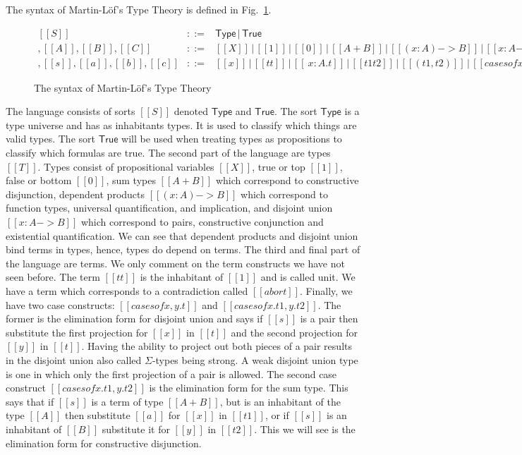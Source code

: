 The syntax of Martin-L\"of's Type Theory is defined in
Fig.~\ref{fig:lof_syntax}.
\begin{figure}
  \begin{center}
    \begin{math}
      \begin{array}{lll}
        [[S]] & ::= & \mathsf{Type}\,|\,\mathsf{True}\\
        [[T]], [[A]], [[B]], [[C]]        & ::= & [[X]]\,|\,[[1]]\,|\,[[0]]\,|\,[[A + B]]\,|\,[[( x : A ) -> B]]\,|\,[[{ x : A } -> B]]\\
        [[t]], [[s]], [[a]], [[b]], [[c]] & ::= & [[x]]\,|\,[[tt]]\,|\,[[\ x : A . t]]\,|\,[[t1 t2]]\,|\,[[( t1 , t2 )]]\,|\,[[case s of x , y . t]]\,|\,[[case s of x . t1 , y . t2]]\,|\,[[abort]]
      \end{array}
    \end{math}
  \end{center}
  \caption{The syntax of Martin-L\"of's Type Theory}
  \label{fig:lof_syntax}
\end{figure}
The language consists of sorts $[[S]]$ denoted $\mathsf{Type}$ and
$\mathsf{True}$. The sort $\mathsf{Type}$ is a type universe and has
as inhabitants types.  It is used to classify which things are valid
types.  The sort $\mathsf{True}$ will be used when treating
types as propositions to classify which formulas are true. The second
part of the language are types $[[T]]$.  Types consist of
propositional variables $[[X]]$, true or top $[[1]]$, false or bottom
$[[0]]$, sum types $[[A + B]]$ which correspond to constructive
disjunction, dependent products $[[(x : A) -> B]]$ which correspond to
function types, universal quantification, and implication, and
disjoint union $[[{ x : A} -> B]]$ which correspond to pairs,
constructive conjunction and existential quantification.  We can see
that dependent products and disjoint union bind terms in types, hence,
types do depend on terms.  The third and final part of the language
are terms.  We only comment on the term constructs we have not seen
before.  The term $[[tt]]$ is the inhabitant of $[[1]]$ and is called
unit.  We have a term which corresponds to a contradiction called
$[[abort]]$. Finally, we have two case constructs: $[[case s of
    x,y.t]]$ and $[[case s of x.t1,y.t2]]$.  The former is the
elimination form for disjoint union and says if $[[s]]$ is a pair then
substitute the first projection for $[[x]]$ in $[[t]]$ and the second
projection for $[[y]]$ in $[[t]]$.  Having the ability to project out
both pieces of a pair results in the disjoint union also called
$\Sigma$-types being strong.  A weak disjoint union type is one in
which only the first projection of a pair is allowed.  The second case
construct $[[case s of x.t1,y.t2]]$ is the elimination form for the
sum type.  This says that if $[[s]]$ is a term of type $[[A+B]]$, but
is an inhabitant of the type $[[A]]$ then substitute $[[a]]$ for
$[[x]]$ in $[[t1]]$, or if $[[s]]$ is an inhabitant of $[[B]]$
substitute it for $[[y]]$ in $[[t2]]$.  This we will see is the
elimination form for constructive disjunction.

